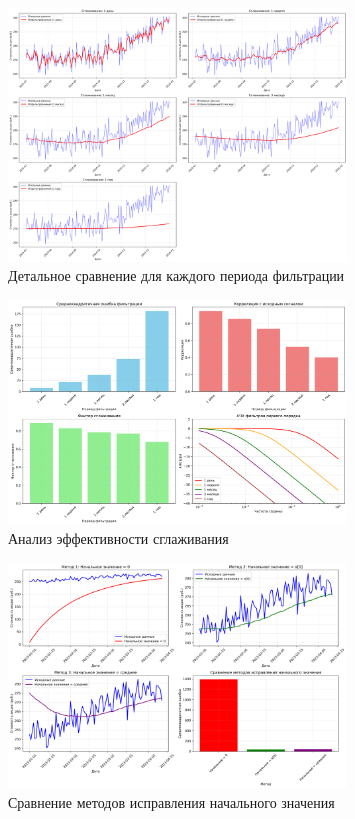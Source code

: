 \begin{figure}[H]
    \centering
    \includegraphics[width=0.8\textwidth]{images/task3/stock_data_smoothing_detailed.png}
    \caption{Детальное сравнение для каждого периода фильтрации}
    \label{fig:stock_smoothing_detailed}
\end{figure}

\begin{figure}[H]
    \centering
    \includegraphics[width=0.8\textwidth]{images/task3/stock_data_smoothing_analysis.png}
    \caption{Анализ эффективности сглаживания}
    \label{fig:stock_smoothing_analysis}
\end{figure}

\begin{figure}[H]
    \centering
    \includegraphics[width=0.8\textwidth]{images/task3/stock_data_initial_value_correction.png}
    \caption{Сравнение методов исправления начального значения}
    \label{fig:stock_initial_correction}
\end{figure}

